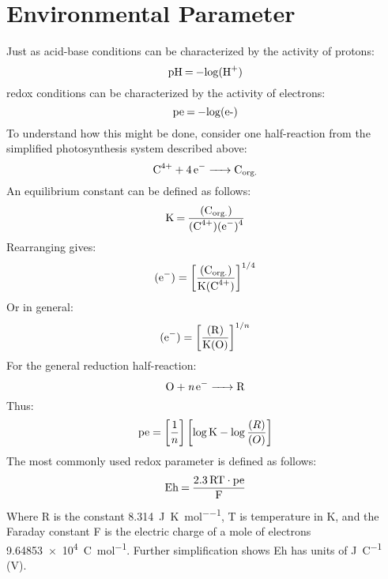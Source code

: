 \section{Environmental Parameter}
Just as acid-base conditions can be characterized by the activity of protons:
\[\ce{pH = -log(H+)}\]
redox conditions can be characterized by the activity of electrons:
\[\ce{pe = -log(e-)}\]
To understand how this might be done, consider one half-reaction from the simplified photosynthesis system described above:
\[\ce{C^4+ + 4e- -> C_{\text{org.}}}\]
An equilibrium constant can be defined as follows:
\[\ce{K = \frac{(C_{\text{org.}})}{(C^4+)(e^-)^4}}\]
Rearranging gives:
\[\ce{(e^-)} = \left[\ce{\frac{(C_{\text{org.}})}{K(C^4+)}}\right]^{1/4}\]
Or in general:
\[\ce{(e^-)} = \left[\ce{\frac{(R)}{K(O)}}\right]^{1/n}\]
For the general reduction half-reaction:
\[\ce{O + \textit{n}\,e^- -> R}\]
Thus:
\[\ce{pe} = \left[\frac{1}{n}\right]\left[\log \ce{K}-\log\frac{(R)}{(O)}\right]\]
The most commonly used redox parameter is defined as follows:
\[\ce{Eh = \frac{2.3RT\cdot pe}{F}}\]
Where R is the constant \qty{8.314}{\joule\per\kelvin\per\mol}, T is temperature in \unit{\K}, and the Faraday constant F is the electric charge of a mole of electrons \qty{9.64853e4}{\coulomb\per\mol}. Further simplification shows Eh has units of \unit{\J\per\coulomb} (\unit{\volt}).
